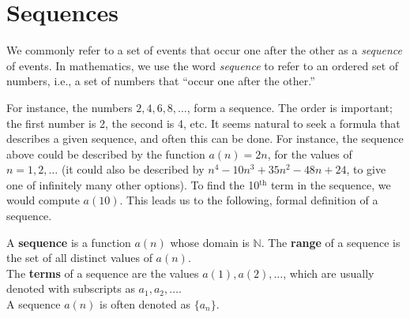 
\section{Sequences}\label{sec:sequences}

We commonly refer to a set of events that occur one after the other as a \textit{sequence} of events. In mathematics, we use the word \textit{sequence} to refer to an ordered set of numbers, i.e., a set of numbers that ``occur one after the other.''

For instance, the numbers $2, 4, 6, 8, \dotsc$, form a sequence. The order is important; the first number is 2, the second is 4, etc. It seems natural to seek a formula that describes a given sequence, and often this can be done. For instance, the sequence above could be described by the function $a(n) = 2n$, for the values of $n = 1, 2, \dotsc$ (it could also be described by $n^4-10 n^3+35 n^2-48n+24$, to give one of infinitely many other options). To find the 10$^\text{th}$ term in the sequence, we would compute $a(10)$. This leads us to the following, formal definition of a sequence.


\begin{definition}[Sequence]\label{def:sequence}
A \textbf{sequence} is a function $a(n)$ whose domain is $\mathbb{N}$. The \textbf{range} of a sequence is the set of all distinct values of $a(n)$.
\\

The \textbf{terms} of a sequence are the values $a(1), a(2), \dotsc$, which are usually denoted with subscripts as $a_1, a_2, \dotsc$.\\

A sequence $a(n)$ is often denoted as $\{a_n\}$.
\end{definition}



